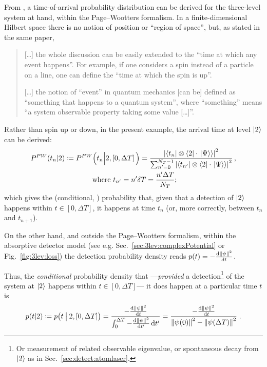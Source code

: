From \cite{Maccone:QMOT}, a time-of-arrival probability distribution can be derived
for the three-level system at hand, within the Page--Wootters formalism.
In a finite-dimensional
Hilbert space there is no notion of position or ``region of space'', but, as stated in the
same paper,
\begin{quote}
  [\dots] the whole discussion can be easily extended to the “time at which any
  event happens”. For example, if one considers a spin instead of a particle on a line, one can define the “time at
  which the spin is up”.

  [\dots] the notion of ``event'' in quantum mechanics [can be] defined as ``something that happens to a
  quantum system'', where ``something'' means ``a system
  observable property taking some value [\dots]''.
\end{quote}
Rather than spin up or down, in the present example, the arrival time at level $\ket{2}$
can be derived:
\begin{multline}\label{eq:3lev:bayesPW}
  P^{PW}(t_n|2) \coloneqq P^{PW}\Big( t_n \Big| 2, \left[0,\Delta{T}\right]\Big) = \frac{
    \abs{\bra{t_n} \otimes \bra{2} \cdot \left.\left| \Psi \right\rangle\right\rangle}^2
  }{
    \sum_{n'=0}^{N_{T} - 1} \abs{\bra{t_{n'}} \otimes \bra{2} \cdot \left.\left| \Psi \right\rangle\right\rangle}^2
  }
  \,\text{,}
  \\
  \text{ where } t_{n'} = n'\delta{T} = \frac{n'\Delta{T}}{N_{T}}
  \text{;}
\end{multline}
which gives the (conditional, ) probability that, given that a detection of $\ket{2}$
happens
within $t \in [0, \Delta T]$, it happens at time $t_n$ (or, more correctly, between $t_n$ and $t_{n+1}$).

On the other hand, and outside the Page--Wootters formalism,
within  the absorptive detector model
(see e.g. Sec.~\ref{sec:3lev:complexPotential} or Fig.~\ref{fig:3lev:loss})
the detection probability density reads $p(t) = - \dv{\norm{\psi}^2}{t}$.

Thus, the \emph{conditional} probability density that
---\emph{provided }a detection\footnote{
  Or measurement of related observable eigenvalue,
  or spontaneous decay from $\ket{2}$ as in Sec.~\ref{sec:detect:atomlaser}.
}
of the system at $\ket{2}$ happens within $t \in [0, \Delta{T}]$---
it does happen at a particular time $t$ is
\begin{equation}\label{3lev:condProb}
  p(t|2) \coloneqq p\big(t   \:\big|\:   2,[0,\Delta{T}]\big)
  =
  \frac{
    - \dv{\norm{\psi}^2}{t}
  }{
    \int_{0}^{\Delta{T}} - \dv{\norm{\psi}^2}{t'} \dd{t'}
  }
  =
  \frac{
    - \dv{\norm{\psi}^2}{t}
  }{
    \norm{\psi(0)}^2 - \norm{\psi(\Delta{T})}^2
  }
  \;\text{.}
\end{equation}

